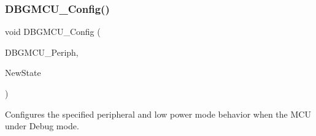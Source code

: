 \subsubsection{\texorpdfstring{DBGMCU\_Config()}{DBGMCU\_Config()}}
{\footnotesize\ttfamily void D\+B\+G\+M\+C\+U\+\_\+\+Config (\begin{DoxyParamCaption}\item[{uint32\+\_\+t}]{D\+B\+G\+M\+C\+U\+\_\+\+Periph,  }\item[{\mbox{\hyperlink{group___exported__types_gac9a7e9a35d2513ec15c3b537aaa4fba1}{Functional\+State}}}]{New\+State }\end{DoxyParamCaption})}



Configures the specified peripheral and low power mode behavior when the M\+CU under Debug mode. 


